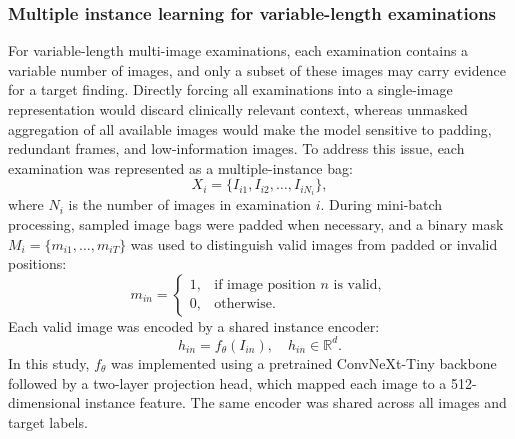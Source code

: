 \documentclass[Afour,sagev,times]{sagej}
\begin{document}
\subsubsection{Multiple instance learning for variable-length examinations}
For variable-length multi-image examinations, each examination contains a variable number of images, and only a subset of these images may carry evidence for a target finding. Directly forcing all examinations into a single-image representation would discard clinically relevant context, whereas unmasked aggregation of all available images would make the model sensitive to padding, redundant frames, and low-information images. To address this issue, each examination was represented as a multiple-instance bag:
\begin{equation}
X_i=\{I_{i1}, I_{i2}, \ldots, I_{iN_i}\},
\end{equation}
where $N_i$ is the number of images in examination $i$. During mini-batch processing, sampled image bags were padded when necessary, and a binary mask $M_i=\{m_{i1},\ldots,m_{iT}\}$ was used to distinguish valid images from padded or invalid positions:
\begin{equation}
m_{in} =
\begin{cases}
1, & \text{if image position } n \text{ is valid},\\
0, & \text{otherwise}.
\end{cases}
\end{equation}
Each valid image was encoded by a shared instance encoder:
\begin{equation}
h_{in}=f_{\theta}(I_{in}), \quad h_{in}\in \mathbb{R}^{d}.
\end{equation}
In this study, $f_{\theta}$ was implemented using a pretrained ConvNeXt-Tiny backbone followed by a two-layer projection head, which mapped each image to a 512-dimensional instance feature.\cite{R17} The same encoder was shared across all images and target labels.
\end{document}
